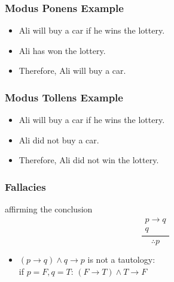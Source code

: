 \documentclass[dvipsnames]{beamer}
\begin{document}
\begin{frame}
  \frametitle{Modus Ponens Example}

  \begin{example}
    \begin{itemize}
      \item Ali will buy a car if he wins the lottery.
      \item Ali has won the lottery.

      \pause
      \medskip
      \item Therefore, Ali will buy a car.
    \end{itemize}
  \end{example}
\end{frame}

\begin{frame}
  \frametitle{Modus Tollens Example}

  \begin{example}
    \begin{itemize}
      \item Ali will buy a car if he wins the lottery.
      \item Ali did not buy a car.

      \pause
      \medskip
      \item Therefore, Ali did not win the lottery.
    \end{itemize}
  \end{example}
\end{frame}

\begin{frame}
  \frametitle{Fallacies}

  \begin{block}{affirming the conclusion}
    \[
    \frac
      {
      \begin{array}{c}
        p \rightarrow q\\
        q
        \end{array}
      }
      {
        \therefore p
      }
    \]
  \end{block}

  \pause
  \begin{itemize}
    \item $(p \rightarrow q) \wedge q \rightarrow p$ is not a tautology:\\
      if $p=F,q=T$: $(F \rightarrow T) \wedge T \rightarrow F$
  \end{itemize}
\end{frame}
\end{document}
